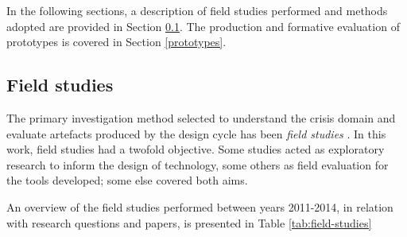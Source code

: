In the following sections, a description of field studies performed and methods adopted are provided in Section \ref{field-studies}. The production and formative evaluation of prototypes is covered in Section \ref{prototypes}.

\subsection{Field studies}\label{field-studies}

The primary investigation method selected to understand the crisis domain and evaluate artefacts produced by the design cycle has been \emph{field studies} \autocite{robson1993real}. In this work, field studies had a twofold objective. Some studies acted as exploratory research to inform the design of technology, some others as field evaluation for the tools developed; some else covered both aims.

An overview of the field studies performed between years 2011-2014, in relation with research questions and papers, is presented in Table \ref{tab:field-studies}

